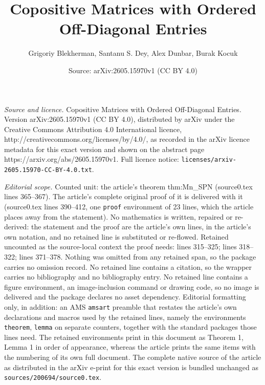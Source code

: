 \documentclass[10pt,a4paper]{amsart}
\title{Copositive Matrices with Ordered Off-Diagonal Entries}
\author{Grigoriy Blekherman, Santanu S. Dey, Alex Dunbar, Burak Kocuk}
\date{Source: arXiv:2605.15970v1 (CC BY 4.0)}
\begin{document}
\maketitle

\noindent\emph{Source and licence.} Copositive Matrices with Ordered Off-Diagonal Entries. Version arXiv:2605.15970v1 (CC BY 4.0), distributed by arXiv under the Creative Commons Attribution 4.0 International licence, http://creativecommons.org/licenses/by/4.0/, as recorded in the arXiv licence metadata for this exact version and shown on the abstract page https://arxiv.org/abs/2605.15970v1. Full licence notice: \texttt{licenses/arxiv-2605.15970-CC-BY-4.0.txt}.\par\smallskip

\noindent\textit{Editorial scope.} Counted unit: the article's theorem thm:Mn\_SPN (source0.tex lines 365--367). The article's complete original proof of it is delivered with it (source0.tex lines 390--412, one \texttt{proof} environment of 23 lines, which the article places away from the statement). No mathematics is written, repaired or re-derived: the statement and the proof are the article's own lines, in the article's own notation, and no retained line is substituted or re-flowed.  Retained uncounted as the source-local context the proof needs: lines 315--325; lines 318--322; lines 371--378.  Nothing was omitted from any retained span, so the package carries no omission record.  No retained line contains a citation, so the wrapper carries no bibliography and no bibliography entry.  No retained line contains a figure environment, an image-inclusion command or drawing code, so no image is delivered and the package declares no asset dependency.  Editorial formatting only, in addition: an AMS \texttt{amsart} preamble that restates the article's own declarations and macros used by the retained lines, namely the environments \texttt{theorem}, \texttt{lemma} on separate counters, together with the standard packages those lines need.  The retained environments print in this document as Theorem 1, Lemma 1 in order of appearance, whereas the article prints the same items with the numbering of its own full document.  The complete native source of the article as distributed in the arXiv e-print for this exact version is bundled unchanged as \texttt{sources/200694/source0.tex}.
\end{document}
